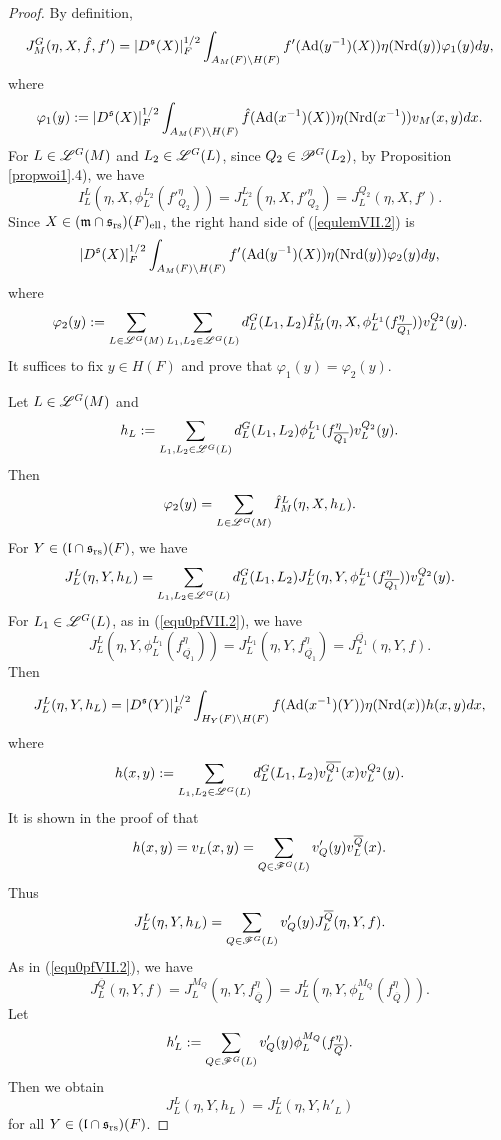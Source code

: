 \documentclass[a4paper]{amsart}
\newcommand{\fm}{{\mathfrak{m}}} \newcommand{\fn}{{\mathfrak{n}}}\newcommand{\fo}{{\mathfrak{o}}} \newcommand{\fp}{{\mathfrak{p}}}
\newcommand{\ov}{\overline}
\theoremstyle{definition}
\theoremstyle{remark}
\numberwithin{equation}{subsection}
\begin{document}
\begin{proof}
By definition, 
$$ J_M^G(\eta, X, \hat{f}, f')=|D^{\mathfrak{s}}(X)|_F^{1/2} \int_{A_M(F)\backslash H(F)} f'({\mathrm{Ad}}(y^{-1})(X)) \eta({\mathrm{Nrd}}(y)) \varphi_1(y) dy, $$
where
$$ \varphi_1(y):=|D^{\mathfrak{s}}(X)|_F^{1/2} \int_{A_M(F)\backslash H(F)} \hat{f}({\mathrm{Ad}}(x^{-1})(X)) \eta({\mathrm{Nrd}}(x^{-1})) v_M(x, y) dx. $$
For $L\in\mathscr{L}^G(M)$ and $L_2\in\mathscr{L}^G(L)$, since $Q_2\in\mathscr{P}^G(L_2)$, by Proposition \ref{propwoi1}.4), we have 
\begin{equation}\label{equ0pfVII.2}
 I_L^L(\eta, X,\phi_L^{L_2}({f'}_{Q_2}^\eta))=J_L^{L_2}(\eta, X, {f'}_{Q_2}^\eta)=J_L^{Q_2}(\eta, X, f'). 
\end{equation}
Since $X\in(\fm\cap\fs_\rs)(F)_\el$, the right hand side of (\ref{equlemVII.2}) is
$$ |D^{\mathfrak{s}}(X)|_F^{1/2} \int_{A_M(F)\backslash H(F)} f'({\mathrm{Ad}}(y^{-1})(X)) \eta({\mathrm{Nrd}}(y)) \varphi_2(y) dy, $$
where
$$ \varphi_2(y):=\sum_{L\in\msl^G(M)} \sum_{L_1,L_2\in\msl^G(L)} d_L^G(L_1,L_2) \hat{I}_M^L(\eta, X, \phi_L^{L_1}(f_{\ov{Q_1}}^\eta)) v_L^{Q_2}(y). $$
It suffices to fix $y\in H(F)$ and prove that $\varphi_1(y)=\varphi_2(y)$. 

Let $L\in\mathscr{L}^G(M)$ and
$$ h_L:=\sum_{L_1,L_2\in\msl^G(L)} d_L^G(L_1,L_2) \phi_L^{L_1}(f_{\ov{Q_1}}^\eta) v_L^{Q_2}(y). $$
Then
$$ \varphi_2(y)=\sum_{L\in\mathscr{L}^G(M)} \hat{I}_M^L(\eta, X, h_L). $$
For $Y\in({\mathfrak{l}}\cap{\mathfrak{s}}_{\mathrm{rs}})(F)$, we have
$$ J_L^L(\eta, Y, h_L)=\sum_{L_1,L_2\in\msl^G(L)} d_L^G(L_1,L_2) J_L^L(\eta, Y, \phi_L^{L_1}(f_{\ov{Q_1}}^\eta)) v_L^{Q_2}(y). $$
For $L_1\in\mathscr{L}^G(L)$, as in (\ref{equ0pfVII.2}), we have
$$ J_L^L(\eta, Y, \phi_L^{L_1}(f_{\ov{Q_1}}^\eta))=J_L^{L_1}(\eta, Y, f_{\ov{Q_1}}^\eta)=J_L^{\ov{Q_1}}(\eta, Y, f). $$
Then
$$ J_L^L(\eta, Y, h_L)=|D^{\mathfrak{s}}(Y)|_F^{1/2} \int_{H_Y(F)\backslash H(F)} f({\mathrm{Ad}}(x^{-1})(Y)) \eta({\mathrm{Nrd}}(x)) h(x, y) dx, $$
where
$$ h(x, y):=\sum_{L_1,L_2\in\msl^G(L)} d_L^G(L_1,L_2) v_L^{\ov{Q_1}}(x) v_L^{Q_2}(y). $$
It is shown in the proof of \cite[Lemme VII.2]{MR1344131} that
$$ h(x, y)=v_L(x,y)=\sum_{Q\in\msf^G(L)} v'_Q(y) v_L^{\ov{Q}}(x). $$
Thus 
$$ J_L^L(\eta, Y, h_L)=\sum_{Q\in\msf^G(L)} v'_Q(y) J_L^{\ov{Q}}(\eta, Y, f). $$
As in (\ref{equ0pfVII.2}), we have
$$ J_L^{\ov{Q}}(\eta, Y, f)=J_L^{M_Q}(\eta, Y, f_{\ov{Q}}^\eta)=J_L^L(\eta, Y, \phi_L^{M_Q}(f_{\ov{Q}}^\eta)). $$
Let
$$ h'_L:=\sum_{Q\in\msf^G(L)} v'_Q(y) \phi_L^{M_Q}(f_{\ov{Q}}^\eta). $$
Then we obtain
\begin{equation}\label{equh_LpfVII.2}
 J_L^L(\eta, Y, h_L)=J_L^L(\eta, Y, h'_L) 
\end{equation}
for all $Y\in({\mathfrak{l}}\cap{\mathfrak{s}}_{\mathrm{rs}})(F)$. 


\end{proof}
\end{document}
